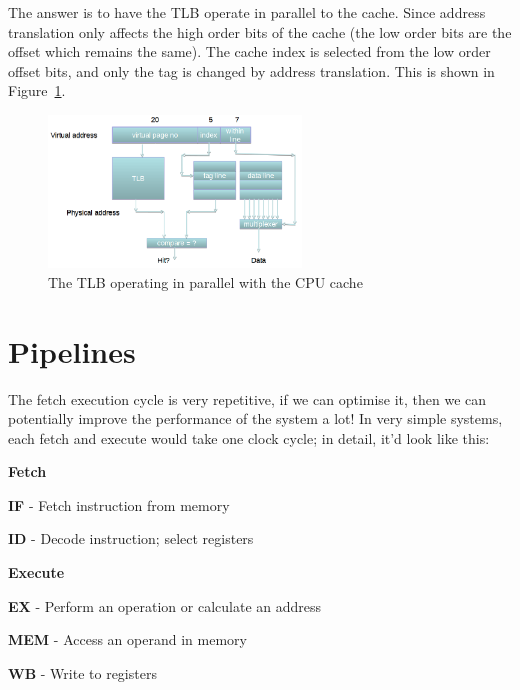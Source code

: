 The answer is to have the TLB operate in parallel to the cache. Since address
translation only affects the high order bits of the cache (the low order bits
are the offset which remains the same). The cache index is selected from the low
order offset bits, and only the tag is changed by address translation. This is 
shown in Figure~\ref{tlb-parallel}.

\begin{figure}
  \centering
  \includegraphics[width=0.6\textwidth]{images/tlb-parallel}
  \caption{The TLB operating in parallel with the CPU cache}
  \label{tlb-parallel}
\end{figure}

\section{Pipelines}
\label{pipelines}

The fetch execution cycle is very repetitive, if we can optimise it, then we can
potentially improve the performance of the system a lot! In very simple systems,
each fetch and execute would take one clock cycle; in detail, it'd look like
this:

\begin{description}
  \item \textbf{Fetch}
    \begin{description}
      \item \textbf{IF} - Fetch instruction from memory
      \item \textbf{ID} - Decode instruction; select registers
    \end{description}
  \item \textbf{Execute}
    \begin{description}
      \item \textbf{EX} - Perform an operation or calculate an address
      \item \textbf{MEM} - Access an operand in memory
      \item \textbf{WB} - Write to registers
    \end{description}
\end{description}

